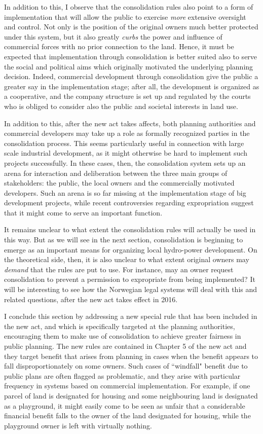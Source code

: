 In addition to this, I observe that the consolidation rules also point to a form of implementation that will allow the public to exercise \emph{more} extensive oversight and control. Not only is the position of the original owners much better protected under this system, but it also greatly \emph{curbs} the power and influence of commercial forces with no prior connection to the land. Hence, it must be expected that implementation through consolidation is better suited also to serve the social and political aims which originally motivated the underlying planning decision. Indeed, commercial development through consolidation give the public a greater say in the implementation stage; after all, the development is organized as a cooperative, and the company structure is set up and regulated by the courts who is obliged to consider also the public and societal interests in land use.

In addition to this, after the new act takes affects, both planning authorities and commercial developers may take up a role as formally recognized parties in the consolidation process. This seems particularly useful in connection with large scale industrial development, as it might otherwise be hard to implement such projects successfully. In these cases, then, the consolidation system sets up an arena for interaction and deliberation between the three main groups of stakeholders: the public, the local owners and the commercially motivated developers. Such an arena is so far missing at the implementation stage of big development projects, while recent controversies regarding expropriation suggest that it might come to serve an important function.

It remains unclear to what extent the consolidation rules will actually be used in this way. But as we will see in the next section, consolidation is beginning to emerge as an important means for organizing local hydro-power development. On the theoretical side, then, it is also unclear to what extent original owners may \emph{demand} that the rules are put to use. For instance, may an owner request consolidation to prevent a permission to expropriate from being implemented? It will be interesting to see how the Norwegian legal systems will deal with this and related questions, after the new act takes effect in 2016.

I conclude this section by addressing a new special rule that has been included in the new act, and which is specifically targeted at the planning authorities, encouraging them to make use of consolidation to achieve  greater fairness in public planning. The new rules are contained in Chapter 5 of the new act and they target benefit that arises from planning in cases when the benefit appears to fall disproportionately on some owners. Such cases of ``windfall" benefit due to public plans are often flagged as problematic, and they arise with particular frequency in systems based on commercial implementation. For example, if one parcel of land is designated for housing and some neighbouring land is designated as a playground, it might easily come to be seen as unfair that a considerable financial benefit falls to the owner of the land designated for housing, while the playground owner is left with virtually nothing.

